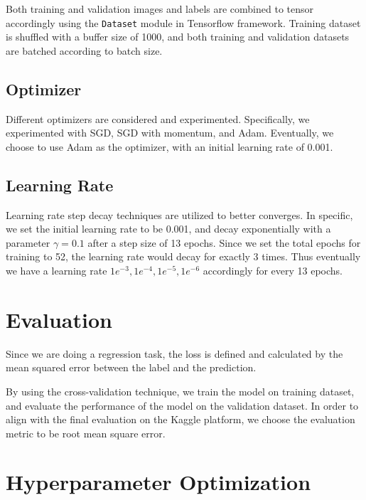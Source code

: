 \documentclass[11pt]{article}
\begin{document}
Both training and validation images and labels are combined to tensor
accordingly using the \texttt{Dataset} module in Tensorflow framework.
Training dataset is shuffled with a buffer size of 1000, and both
training and validation datasets are batched according to batch size.

    \hypertarget{optimizer}{%
\subsection{Optimizer}\label{optimizer}}

Different optimizers are considered and experimented. Specifically, we
experimented with SGD, SGD with momentum, and Adam. Eventually, we
choose to use Adam as the optimizer, with an initial learning rate of
0.001.

    \hypertarget{learning-rate}{%
\subsection{Learning Rate}\label{learning-rate}}

Learning rate step decay techniques are utilized to better converges. In
specific, we set the initial learning rate to be 0.001, and decay
exponentially with a parameter \(\gamma = 0.1\) after a step size of 13
epochs. Since we set the total epochs for training to 52, the learning
rate would decay for exactly 3 times. Thus eventually we have a learning
rate \(1e^{-3}, 1e^{-4}, 1e^{-5}, 1e^{-6}\) accordingly for every 13
epochs.

    \hypertarget{evaluation}{%
\section{Evaluation}\label{evaluation}}

Since we are doing a regression task, the loss is defined and calculated
by the mean squared error between the label and the prediction.

By using the cross-validation technique, we train the model on training
dataset, and evaluate the performance of the model on the validation
dataset. In order to align with the final evaluation on the Kaggle
platform, we choose the evaluation metric to be root mean square error.

    \hypertarget{hyperparameter-optimization}{%
\section{Hyperparameter
Optimization}\label{hyperparameter-optimization}}
\end{document}

